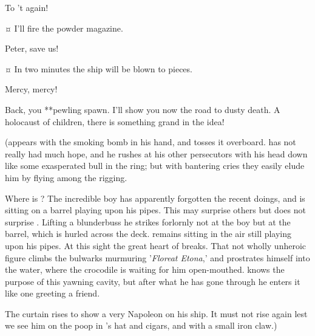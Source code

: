 \begin{drama}
\hookspeaks
To 't again!


\hookspeaks {}¤
I'll fire the powder magazine.

Peter, save us!


\hookspeaks {}¤
In two minutes the ship will be blown to pieces.


Mercy, mercy!

\hookspeaks
Back, you **pewling spawn.
I'll show you now the road to dusty death.
A holocaust of children, there is something grand in the idea!

\begin{stagedir}
(\peter appears with the smoking bomb in his hand, and tosses it overboard.
\hook has not really had much hope,
and he rushes at his other persecutors with his head down like some exasperated bull in the ring;
but with bantering cries they easily elude him by flying among the rigging.

Where is \peter?
The incredible boy has apparently forgotten the recent doings,
and is sitting on a barrel playing upon his pipes.
This may surprise others but does not surprise \hook.
Lifting a blunderbuss he strikes forlornly
not at the boy but at the barrel, which is hurled across the deck.
\peter remains sitting in the air still playing upon his pipes.
At this sight the great heart of \hook breaks.
That not wholly unheroic figure climbs the bulwarks murmuring '\emph{Floreat Etona},'
and prostrates himself into the water, where the crocodile is waiting for him open-mouthed.
\hook knows the purpose of this yawning cavity,
but after what he has gone through he enters it like one greeting a friend.

The curtain rises to show \peter a very Napoleon on his ship.
It must not rise again lest we see him on the poop in \hook's hat and cigars,
and with a small iron claw.)
\end{stagedir}

\end{drama}

\endinput
